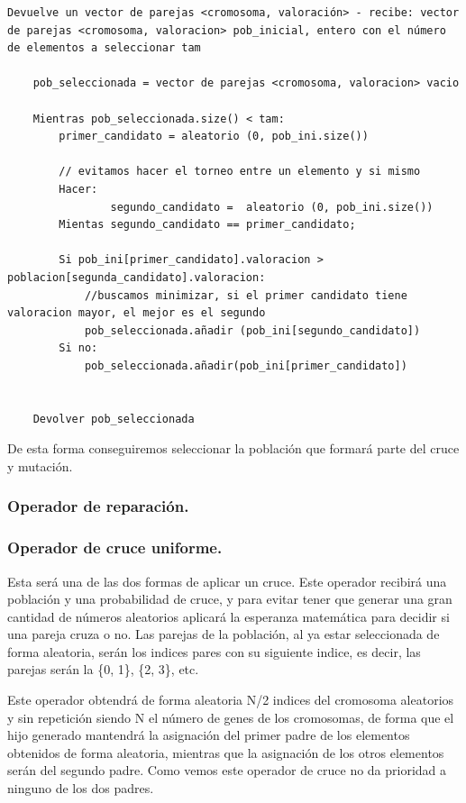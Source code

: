 \documentclass[12pt, spanish]{article}
\begin{document}
\begin{lstlisting}
Devuelve un vector de parejas <cromosoma, valoración> - recibe: vector de parejas <cromosoma, valoracion> pob_inicial, entero con el número de elementos a seleccionar tam

	pob_seleccionada = vector de parejas <cromosoma, valoracion> vacio
	
	Mientras pob_seleccionada.size() < tam:
		primer_candidato = aleatorio (0, pob_ini.size())
		
		// evitamos hacer el torneo entre un elemento y si mismo
		Hacer:
				segundo_candidato =  aleatorio (0, pob_ini.size())
		Mientas segundo_candidato == primer_candidato;
		
		Si pob_ini[primer_candidato].valoracion > poblacion[segunda_candidato].valoracion:
			//buscamos minimizar, si el primer candidato tiene valoracion mayor, el mejor es el segundo
			pob_seleccionada.añadir (pob_ini[segundo_candidato])
		Si no:
			pob_seleccionada.añadir(pob_ini[primer_candidato])


	Devolver pob_seleccionada
\end{lstlisting}

De esta forma conseguiremos seleccionar la población que formará parte del cruce y mutación.


\subsubsection{Operador de reparación.}


\subsubsection{Operador de cruce uniforme.}

Esta será una de las dos formas de aplicar un cruce. Este operador recibirá una población y una probabilidad de cruce, y para evitar tener que generar una gran cantidad de números aleatorios aplicará la esperanza matemática para decidir si una pareja cruza o no. Las parejas de la población, al ya estar seleccionada de forma aleatoria, serán los indices pares con su siguiente indice, es decir, las parejas serán la \{0, 1\}, \{2, 3\}, etc.

 Este operador obtendrá de forma aleatoria N/2 indices del cromosoma aleatorios y sin repetición siendo N el número de genes de los cromosomas, de forma que el hijo generado mantendrá la asignación del primer padre de los elementos obtenidos de forma aleatoria, mientras que la asignación de los otros elementos serán del segundo padre. Como vemos este operador de cruce no da prioridad a ninguno de los dos padres.
 
\end{document}
